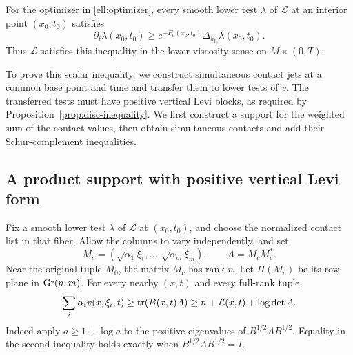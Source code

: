 \begin{proposition}\label{prop:ellipsoid-comparison}
For the optimizer in \eqref{ell:optimizer}, every smooth lower test
$\lambda$ of $\mathcal L$ at an interior point $(x_0,t_0)$ satisfies
\begin{equation}\label{ell:volume-viscosity}
 \partial_t\lambda(x_0,t_0)
 \ge e^{-F_0(x_0,t_0)}\Delta_{h_{t_0}}\lambda(x_0,t_0).
\end{equation}
Thus $\mathcal L$ satisfies this inequality in the lower viscosity
sense on $M\times(0,T)$.
\end{proposition}

To prove this scalar inequality, we construct simultaneous contact
jets at a common base point and time and transfer them to lower tests
of $v$.  The transferred tests must have positive vertical Levi blocks,
as required by
Proposition~\ref{prop:disc-inequality}.  We first construct a support
for the weighted sum of the contact values, then obtain simultaneous
contacts and add their Schur-complement inequalities.

\subsection{A product support with positive vertical Levi form}

Fix a smooth lower test $\lambda$ of $\mathcal L$ at $(x_0,t_0)$,
and choose the normalized contact list in that fiber.  Allow the
columns to vary independently, and set
\begin{equation}\label{ell:rectangular-matrix}
 M_c=(\sqrt{\alpha_1}\xi_1,\ldots,\sqrt{\alpha_m}\xi_m),
 \qquad A=M_cM_c^*.
\end{equation}
Near the original tuple $M_0$, the matrix $M_c$ has rank $n$.
Let $\Pi(M_c)$ be its row plane in $\operatorname{Gr}(n,m)$.
For every nearby $(x,t)$ and every full-rank tuple,
\begin{equation}\label{ell:product-support}
 \sum_i\alpha_i v(x,\xi_i,t)
 \ge\operatorname{tr}(B(x,t)A)
 \ge n+\mathcal L(x,t)+\log\det A.
\end{equation}
Indeed apply $a\ge1+\log a$ to the positive eigenvalues of
$B^{1/2}AB^{1/2}$.  Equality in the second inequality holds exactly
when $B^{1/2}AB^{1/2}=I$.

